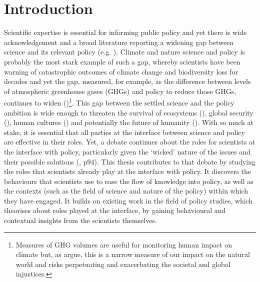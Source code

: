 \chapter{Introduction}\label{ch:intro}

Scientific expertise is essential for informing public policy and yet there is wide acknowledgement and a broad literature reporting a widening gap between science and its relevant policy (e.g. \cite{Nau2009,EdlerKB2022}). Climate and nature science and policy is probably the most stark example of such a gap, whereby scientists have been warning of catastrophic outcomes of climate change and biodiversity loss for decades and yet the gap, measured, for example, as the difference between levels of atmospheric greenhouse gases (GHGs) and policy to reduce those GHGs, continues to widen (\cite{StoddardEtAl2021,IPBES2022,IPCC2023})\footnote{Measures of GHG volumes are useful for monitoring human impact on climate but, as \textcite{MorenoSF2016} argue, this is a narrow measure of our impact on the natural world and risks perpetuating and exacerbating the societal and global injustices.}. This gap between the settled science and the policy ambition is wide enough to threaten the survival of ecosystems (\cite{DiazEtAl2019,IPBES2022}), global security (\cite{WEF2024}), human cultures (\cite{TschakertEAKO2019}) and potentially the future of humanity (\cite{McKayEtAl2022}). With so much at stake, it is essential that all parties at the interface between science and policy are effective in their roles. Yet, a debate continues about the roles for scientists at the interface with policy, particularly given the `wicked' nature of the issues and their possible solutions (\cite{Cairney2016}, p94). This thesis contributes to that debate by studying the roles that scientists already play at the interface with policy. It discovers the behaviours that scientists use to ease the flow of knowledge into policy, as well as the contexts (such as the field of science and nature of the policy) within which they have engaged. It builds on existing work in the field of policy studies, which theorises about roles played at the interface, by gaining behavioural and contextual insights from the scientists themselves.

